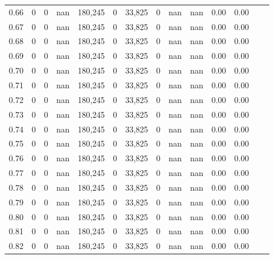 \begin{tabular}{rrrrrrrrrrrrrr}
0.66 &       0 &      0 &     nan &  180,245 &        0 &  33,825 &       0 &   nan &   nan &  0.00 &      0.00 \\
0.67 &       0 &      0 &     nan &  180,245 &        0 &  33,825 &       0 &   nan &   nan &  0.00 &      0.00 \\
0.68 &       0 &      0 &     nan &  180,245 &        0 &  33,825 &       0 &   nan &   nan &  0.00 &      0.00 \\
0.69 &       0 &      0 &     nan &  180,245 &        0 &  33,825 &       0 &   nan &   nan &  0.00 &      0.00 \\
0.70 &       0 &      0 &     nan &  180,245 &        0 &  33,825 &       0 &   nan &   nan &  0.00 &      0.00 \\
0.71 &       0 &      0 &     nan &  180,245 &        0 &  33,825 &       0 &   nan &   nan &  0.00 &      0.00 \\
0.72 &       0 &      0 &     nan &  180,245 &        0 &  33,825 &       0 &   nan &   nan &  0.00 &      0.00 \\
0.73 &       0 &      0 &     nan &  180,245 &        0 &  33,825 &       0 &   nan &   nan &  0.00 &      0.00 \\
0.74 &       0 &      0 &     nan &  180,245 &        0 &  33,825 &       0 &   nan &   nan &  0.00 &      0.00 \\
0.75 &       0 &      0 &     nan &  180,245 &        0 &  33,825 &       0 &   nan &   nan &  0.00 &      0.00 \\
0.76 &       0 &      0 &     nan &  180,245 &        0 &  33,825 &       0 &   nan &   nan &  0.00 &      0.00 \\
0.77 &       0 &      0 &     nan &  180,245 &        0 &  33,825 &       0 &   nan &   nan &  0.00 &      0.00 \\
0.78 &       0 &      0 &     nan &  180,245 &        0 &  33,825 &       0 &   nan &   nan &  0.00 &      0.00 \\
0.79 &       0 &      0 &     nan &  180,245 &        0 &  33,825 &       0 &   nan &   nan &  0.00 &      0.00 \\
0.80 &       0 &      0 &     nan &  180,245 &        0 &  33,825 &       0 &   nan &   nan &  0.00 &      0.00 \\
0.81 &       0 &      0 &     nan &  180,245 &        0 &  33,825 &       0 &   nan &   nan &  0.00 &      0.00 \\
0.82 &       0 &      0 &     nan &  180,245 &        0 &  33,825 &       0 &   nan &   nan &  0.00 &      0.00 \\

\end{tabular}
